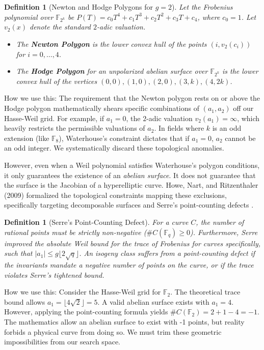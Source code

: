 \documentclass[letterpaper, 11pt]{article}
\newtheorem{definition}[theorem]{Definition}
\begin{document}
\begin{definition}[Newton and Hodge Polygons for $g=2$]
Let the Frobenius polynomial over $\mathbb{F}_{2^k}$ be $P(T) = c_0T^4 + c_1T^3 + c_2T^2 + c_3T + c_4$, where $c_0=1$. Let $v_2(x)$ denote the standard $2$-adic valuation. 
\begin{itemize}
    \item The \textbf{Newton Polygon} is the lower convex hull of the points $(i, v_2(c_{i}))$ for $i = 0, \dots, 4$. 
    \item The \textbf{Hodge Polygon} for an unpolarized abelian surface over $\mathbb{F}_{2^k}$ is the lower convex hull of the vertices $(0,0), (1,0), (2,0), (3,k), (4,2k)$.
\end{itemize}
\end{definition}

How we use this: The requirement that the Newton polygon rests on or above the Hodge polygon mathematically shears specific combinations of $(a_1, a_2)$ off our Hasse-Weil grid. For example, if $a_1 = 0$, the $2$-adic valuation $v_2(a_1) = \infty$, which heavily restricts the permissible valuations of $a_2$. In fields where $k$ is an odd extension (like $\mathbb{F}_8$), Waterhouse's constraint dictates that if $a_1 = 0$, $a_2$ cannot be an odd integer. We systematically discard these topological anomalies.

However, even when a Weil polynomial satisfies Waterhouse's polygon conditions, it only guarantees the existence of an \textit{abelian surface}. It does not guarantee that the surface is the Jacobian of a hyperelliptic curve. Howe, Nart, and Ritzenthaler (2009) formalized the topological constraints mapping these exclusions, specifically targeting decomposable surfaces and Serre's point-counting defects \cite{Howe2009}. 

\begin{definition}[Serre's Point-Counting Defect]
For a curve $C$, the number of rational points must be strictly non-negative ($\#C(\mathbb{F}_q) \ge 0$). Furthermore, Serre improved the absolute Weil bound for the trace of Frobenius for curves specifically, such that $|a_1| \le g \lfloor 2\sqrt{q} \rfloor$. An isogeny class suffers from a point-counting defect if the invariants mandate a negative number of points on the curve, or if the trace violates Serre's tightened bound.
\end{definition}

How we use this: Consider the Hasse-Weil grid for $\mathbb{F}_2$. The theoretical trace bound allows $a_1 = \lfloor 4\sqrt{2} \rfloor = 5$. A valid abelian surface exists with $a_1 = 4$. However, applying the point-counting formula yields $\#C(\mathbb{F}_2) = 2 + 1 - 4 = -1$. The mathematics allow an abelian surface to exist with -1 points, but reality forbids a physical curve from doing so. We must trim these geometric impossibilities from our search space.
\end{document}
